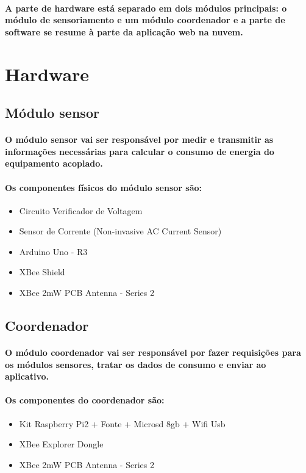 \paragraph{
	A parte de hardware está separado em dois módulos principais: o módulo de sensoriamento e um módulo coordenador e a parte de software se resume à parte da aplicação web na nuvem.
}
\section{Hardware}
\label{Sec:hardware}
\subsection{Módulo sensor}
\paragraph{
	O módulo sensor vai ser responsável por medir e transmitir as informações necessárias para calcular o consumo de energia do equipamento acoplado.
}
\paragraph{
	Os componentes físicos do módulo sensor são:
}
\begin{itemize}
\item Circuito Verificador de Voltagem
\item Sensor de Corrente (Non-invasive AC Current Sensor)
\item Arduino Uno - R3
\item XBee Shield
\item XBee 2mW PCB Antenna - Series 2
\end{itemize}

\subsection{Coordenador}
\paragraph{
	O módulo coordenador vai ser responsável por fazer requisições para os módulos sensores, tratar os dados de consumo e enviar ao aplicativo.
}
\paragraph{
	Os componentes do coordenador são:
}
\begin{itemize}
\item Kit Raspberry Pi2 + Fonte + Microsd 8gb + Wifi Usb
\item XBee Explorer Dongle
\item XBee 2mW PCB Antenna - Series 2
\end{itemize}

